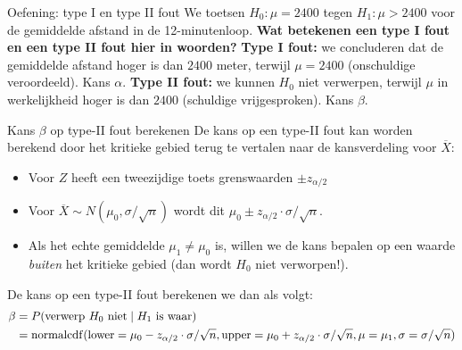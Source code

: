     \begin{frame}{Oefening: type I en type II fout}
        We toetsen $H_0: \mu = 2400$ tegen $H_1: \mu > 2400$ voor de gemiddelde afstand in de 12-minutenloop.
        \vfill
        \textbf{Wat betekenen een type I fout en een type II fout hier in woorden?}
        \pause\vfill
        {\color{highlightcolor}
        \textbf{Type I fout:} we concluderen dat de gemiddelde afstand hoger is dan $2400$ meter, terwijl $\mu = 2400$ (onschuldige veroordeeld). Kans $\alpha$.
        \vfill\pause
        \textbf{Type II fout:} we kunnen $H_0$ niet verwerpen, terwijl $\mu$ in werkelijkheid hoger is dan $2400$ (schuldige vrijgesproken). Kans $\beta$.}
    \end{frame}

    \begin{frame}{Kans $\beta$ op type-II fout berekenen}
        De kans op een type-II fout kan worden berekend door het kritieke gebied terug te vertalen naar de kansverdeling voor $\overline{X}$:
        \begin{itemize}
            \item Voor $Z$ heeft een tweezijdige toets grenswaarden $\pm z_{\alpha/2}$
            \item Voor $\overline{X} \sim N(\mu_0, \sigma/\sqrt{n})$ wordt dit $\mu_0 \pm z_{\alpha/2} \cdot \sigma / \sqrt{n}$.
            \item Als het echte gemiddelde $\mu_1 \neq \mu_0$ is, willen we de kans bepalen op een waarde \emph{buiten} het kritieke gebied (dan wordt $H_0$ niet verworpen!).
        \end{itemize}

        De kans op een type-II fout berekenen we dan als volgt:
        \begin{align*}
            \beta   &= P(\text{verwerp $H_0$ niet} \mid \text{$H_1$ is waar}) \\
                    &= \operatorname{normalcdf}(\text{lower}=\mu_0 - z_{\alpha/2} \cdot \sigma / \sqrt{n}, \text{upper}=\mu_0 + z_{\alpha/2} \cdot \sigma / \sqrt{n}, \mu=\mu_1,\sigma=\sigma / \sqrt{n})
        \end{align*}
    \end{frame}

